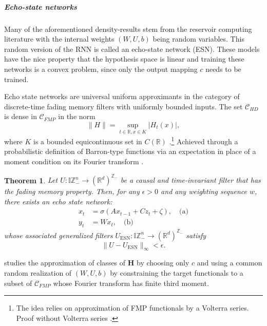 \documentclass{article}
\newtheorem{theorem}{Theorem}
\theoremstyle{definition}
\theoremstyle{remark}
\begin{document}
\subparagraph{Echo-state networks}
Many of the aforementioned density-results stem from the reservoir computing literature with the internal weights $(W, U, b)$ being random variables. 
This random version of the RNN is called an echo-state network (ESN).
These models have the nice property that the hypothesis space is linear and training these networks is a convex problem, since only the output mapping $c$ needs to be trained.

Echo state networks are universal uniform approximants in the category of discrete-time fading memory filters with uniformly bounded inputs\citep{grigoryeva2018echo,grigoryeva2018universal}. 
The set \( \mathcal{C}_{HD} \) is dense in \(  \mathcal{C}_{FMP} \) in the norm 
\[
\|H\| = \sup_{t \in \mathbb{R}, x \in K} |H_t(x)|,
\]
where \( K \) is a bounded equicontinuous set in \( C(\mathbb{R}) \) \citep{boyd1985fading, grigoryeva2018echo}.\footnote{The idea relies on approximation of FMP functionals by a Volterra series. Proof without Volterra series \citep{grigoryeva2019differentiable}.}
Achieved through a probabilistic definition of Barron-type functions \citep{barron1992neural} via an expectation in place of a moment condition on its Fourier transform \citep{ma2018priori,ma2020towards}.

\begin{theorem}
Let \( U : \mathbb{I}\mathbb{Z}_{-}^n \to (\mathbb{R}^d)^{\mathbb{Z}_{-}} \) be a causal and time-invariant filter that has the fading memory property. Then, for any \( \epsilon > 0 \) and any weighting sequence \( w \), there exists an echo state network:
\[
\begin{aligned}
    x_t &= \sigma(A x_{t-1} + C z_t + \zeta), \quad \text{(a)} \\
    y_t &= W x_t, \quad \text{(b)}
\end{aligned}
\tag{4.1}
\]
whose associated generalized filters \( U_{\text{ESN}} : \mathbb{I}\mathbb{Z}_{-}^n \to (\mathbb{R}^d)^{\mathbb{Z}_{-}} \) satisfy
\[
\| U - U_{\text{ESN}} \|_{\infty} < \epsilon.
\]
\end{theorem}

\citet{gonon2023approximation} studies the approximation of classes of $\mathbf{H}$ by choosing only $c$ and using a common random realization of $(W, U, b)$ by constraining the target functionals to a subset of $\mathcal{C}_{FMP}$ whose Fourier transform has finite third moment.
\end{document}
